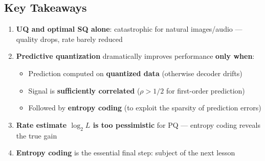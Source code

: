\subsection{Key Takeaways}

\begin{enumerate}
\item \textbf{UQ and optimal SQ alone}: catastrophic for natural images/audio — quality drops, rate barely reduced
\item \textbf{Predictive quantization} dramatically improves performance \textbf{only when}:
\begin{itemize}
\item Prediction computed on \textbf{quantized data} (otherwise decoder drifts)
\item Signal is \textbf{sufficiently correlated} ($\rho > 1/2$ for first-order prediction)
\item Followed by \textbf{entropy coding} (to exploit the sparsity of prediction errors)
\end{itemize}
\item \textbf{Rate estimate $\log_2 L$ is too pessimistic} for PQ — entropy coding reveals the true gain
\item \textbf{Entropy coding} is the essential final step: subject of the next lesson
\end{enumerate}

